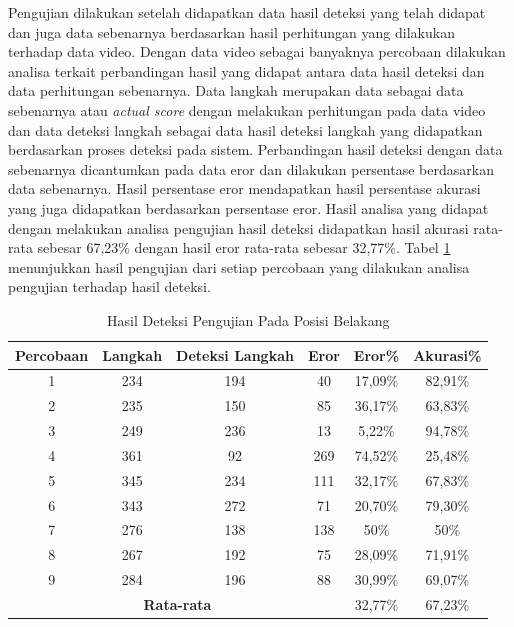 Pengujian dilakukan setelah didapatkan data hasil deteksi yang telah didapat dan juga data sebenarnya berdasarkan hasil perhitungan yang dilakukan terhadap data video. Dengan data video sebagai banyaknya percobaan dilakukan analisa terkait perbandingan hasil yang didapat antara data hasil deteksi dan data perhitungan sebenarnya. Data langkah merupakan data sebagai data sebenarnya atau \emph{actual score} dengan melakukan perhitungan pada data video dan data deteksi langkah sebagai data hasil deteksi langkah yang didapatkan berdasarkan proses deteksi pada sistem. Perbandingan hasil deteksi dengan data sebenarnya dicantumkan pada data eror dan dilakukan persentase berdasarkan data sebenarnya. Hasil persentase eror mendapatkan hasil persentase akurasi yang juga didapatkan berdasarkan persentase eror. Hasil analisa yang didapat dengan melakukan analisa pengujian hasil deteksi didapatkan hasil akurasi rata-rata sebesar 67,23\% dengan hasil eror rata-rata sebesar 32,77\%. Tabel \ref{tb:PengujianPosisiBelakangAnalisaDeteksi} menunjukkan hasil pengujian dari setiap percobaan yang dilakukan analisa pengujian terhadap hasil deteksi.

\begin{longtable}{|c|c|c|c|c|c|}
  \caption{Hasil Deteksi Pengujian Pada Posisi Belakang}
  \label{tb:PengujianPosisiBelakangAnalisaDeteksi}                                   \\
  \hline
  \rowcolor[HTML]{C0C0C0}
  \textbf{Percobaan} & \textbf{Langkah} & \textbf{Deteksi Langkah} & \textbf{Eror} & \textbf{Eror\%} & \textbf{Akurasi\%} \\
  \hline
  1   & 234   & 194  & 40   & 17,09\%    & 82,91\%   \\
  \hline
  2   & 235   & 150  & 85   & 36,17\%    & 63,83\%   \\
  \hline
  3   & 249   & 236  & 13   & 5,22\%     & 94,78\%   \\
  \hline
  4   & 361   & 92   & 269  & 74,52\%    & 25,48\%   \\
  \hline
  5   & 345   & 234  & 111  & 32,17\%    & 67,83\%   \\
  \hline
  6   & 343   & 272  & 71   & 20,70\%    & 79,30\%   \\
  \hline
  7   & 276   & 138  & 138  & 50\%       & 50\%   \\
  \hline
  8   & 267   & 192  & 75   & 28,09\%    & 71,91\%   \\
  \hline
  9   & 284   & 196  & 88   & 30,99\%    & 69,07\%   \\
  \hline

  \multicolumn{4}{|c|}{\textbf{Rata-rata}} & 32,77\% & 67,23\% \\
  \hline
\end{longtable}

